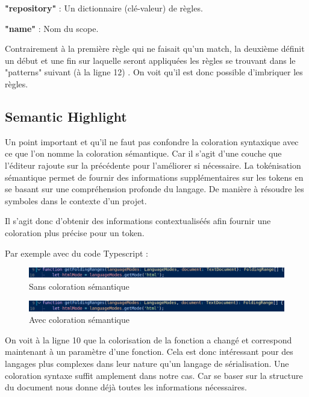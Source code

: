\documentclass[
    iict, %
    il, %
]{heig-tb}
\begin{document}
\textbf{"repository"} : Un dictionnaire (clé-valeur) de règles.

\textbf{"name"} : Nom du scope.

Contrairement à la première règle qui ne faisait qu'un match, la deuxième définit un début et une fin sur laquelle seront appliquées les règles se trouvant dans le "patterns" suivant (à la ligne 12) . On voit qu'il est donc possible d'imbriquer les règles.

\subsection{Semantic Highlight}

Un point important et qu'il ne faut pas confondre la coloration syntaxique avec ce que l'on nomme la coloration sémantique. Car il s'agit d'une couche que l'éditeur rajoute sur la précédente pour l'améliorer si nécessaire.
La tokénisation sémantique permet de fournir des informations supplémentaires sur les tokens en se basant sur une compréhension profonde du langage.
De manière à résoudre les symboles dans le contexte d'un projet.

Il s'agit donc d'obtenir des informations contextualiséés afin fournir une coloration plus précise pour un token.

Par exemple avec du code Typescript :

\begin{figure}[!h]
    \begin{center}
        \includegraphics[width=15cm]{assets/figures/semantic-coloration-without.png}
    \end{center}
    \caption[Sans coloration sémantique]{\label{semantic-coloration-without} Sans coloration sémantique}
\end{figure}

\begin{figure}[!h]
    \begin{center}
        \includegraphics[width=15cm]{assets/figures/semantic-coloration-with.png}
    \end{center}
    \caption[Sans coloration sémantique ]{\label{semantic-coloration-with} Avec coloration sémantique }
\end{figure}

On voit à la ligne 10 que la colorisation de la fonction a changé et correspond maintenant à un paramètre d'une fonction.
Cela est donc intéressant pour des langages plus complexes dans leur nature qu'un langage de sérialisation. Une coloration syntaxe suffit amplement dans notre cas.
Car se baser sur la structure du document nous donne déjà toutes les informations nécessaires.
\end{document}
